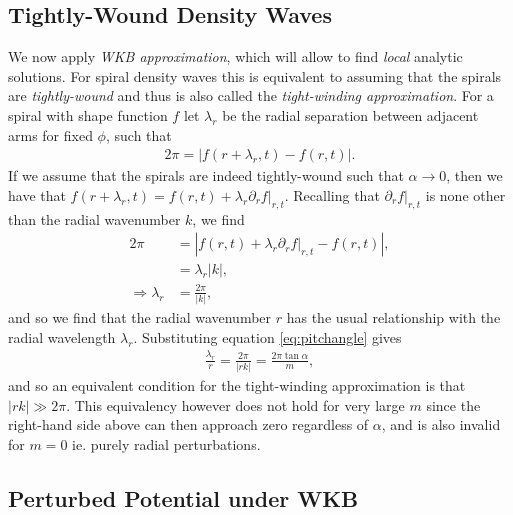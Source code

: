 \subsection{Tightly-Wound Density Waves}

We now apply \textit{WKB approximation}, which will allow to find \textit{local} analytic solutions.
For spiral density waves this is equivalent to assuming that the spirals are \textit{tightly-wound} and thus is also called the \textit{tight-winding approximation}.
For a spiral with shape function $f$ let $\lambda_r$ be the radial separation between adjacent arms for fixed $\phi$, such that
\begin{align}
    2\pi = \left| f(r+\lambda_r, t) - f(r,t) \right|.
\end{align}
If we assume that the spirals are indeed tightly-wound such that $\alpha\rightarrow 0$, then we have that $f(r+\lambda_r,t)=f(r,t) + \lambda_r \partial_r f |_{r,t}$. 
Recalling that $\partial_r f |_{r,t}$ is none other than the radial wavenumber $k$, we find
\begin{align}
    2 \pi &= \left| f(r,t) + \lambda_r \partial_r f |_{r,t} - f(r,t) \right|, \\
    &= \lambda_r | k |, \\
    \Rightarrow \lambda_r &= \frac{2 \pi}{|k|},
\end{align}
and so we find that the radial wavenumber $r$ has the usual relationship with the radial wavelength $\lambda_r$. 
Substituting equation \ref{eq:pitchangle} gives
\begin{align}
    \frac{\lambda_r}{r} = \frac{2 \pi}{|rk|} =  \frac{2 \pi \tan \alpha}{m},
\end{align}
and so an equivalent condition for the tight-winding approximation is that $|rk| \gg 2 \pi$. 
This equivalency however does not hold for very large $m$ since the right-hand side above can then approach zero regardless of $\alpha$, and is also invalid for $m = 0$ ie. purely radial perturbations.

\subsection{Perturbed Potential under WKB}

